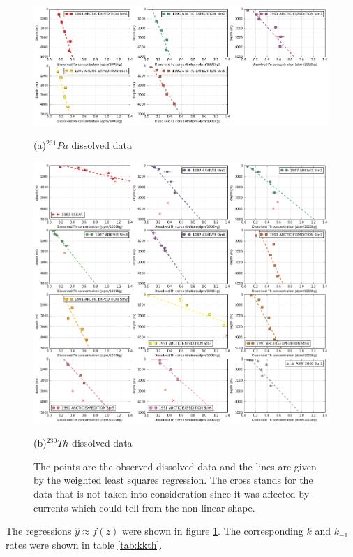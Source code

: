 \documentclass[paper=a4, fontsize=11pt]{scrartcl} %
\numberwithin{equation}{section} %
\numberwithin{figure}{section} %
\numberwithin{table}{section} %
\begin{document}
\begin{figure}[!h]
\centering
  \includegraphics[width=30pc]{Figures/Diss_Pa_all.pdf}
  \caption*{(a)$^{231}Pa$ dissolved data}
\centering  
  \includegraphics[width=30pc]{Figures/Diss_Th_all.pdf}
  \caption*{(b)$^{230}Th$ dissolved data}
\caption{The points are the observed dissolved data and the lines are given by the weighted least squares regression. The cross stands for the data that is not taken into consideration since it was affected by currents which could tell from the non-linear shape.}
 \label{fig:all_eqn}
\end{figure}

The regressions $\hat{y}\approx f\left(z\right)$ were shown in figure \ref{fig:all_eqn}. The corresponding ${k}$ and $k_{-1}$ rates were shown in table \ref{tab:kkth}. 
\end{document}
